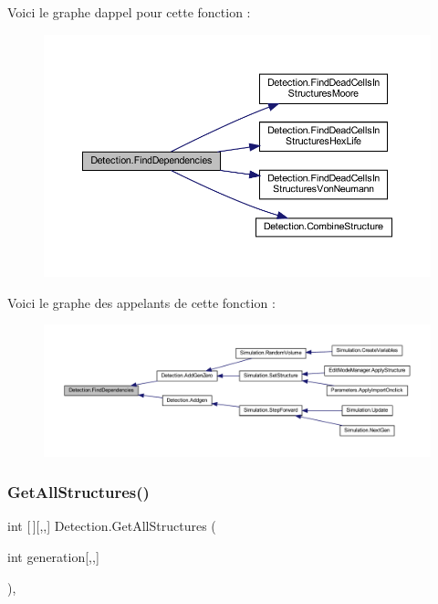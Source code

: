 Voici le graphe d\textquotesingle{}appel pour cette fonction \+:
\nopagebreak
\begin{figure}[H]
\begin{center}
\leavevmode
\includegraphics[width=350pt]{class_detection_a0f5d7b85c0daaf07503132a2faa23bcf_cgraph}
\end{center}
\end{figure}
Voici le graphe des appelants de cette fonction \+:
\nopagebreak
\begin{figure}[H]
\begin{center}
\leavevmode
\includegraphics[width=350pt]{class_detection_a0f5d7b85c0daaf07503132a2faa23bcf_icgraph}
\end{center}
\end{figure}
\mbox{\label{class_detection_a56dffa1e7a06c20bfaa24ac287a9883f}} 
\subsubsection{\texorpdfstring{Get\+All\+Structures()}{GetAllStructures()}}
{\footnotesize\ttfamily int \mbox{[}$\,$\mbox{]}\mbox{[},,\mbox{]} Detection.\+Get\+All\+Structures (\begin{DoxyParamCaption}\item[{int}]{generation\mbox{[},,\mbox{]} }\end{DoxyParamCaption})\hspace{0.3cm}{\ttfamily [inline]}, {\ttfamily [private]}}



